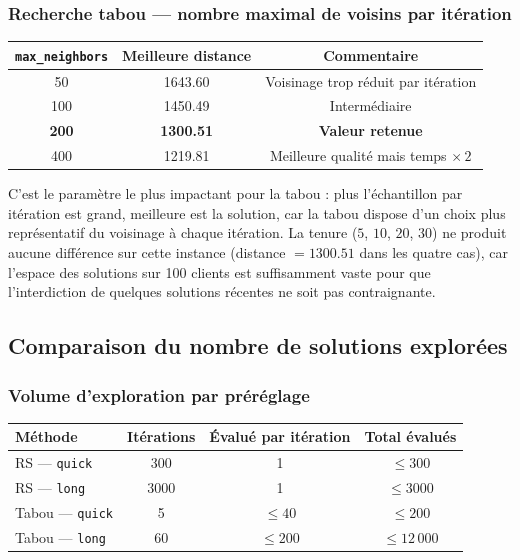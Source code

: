 \documentclass[11pt,a4paper]{article}
\begin{document}
\subsubsection*{Recherche tabou — nombre maximal de voisins par itération}

\begin{center}
\begin{tabular}{ccc}
\toprule
\texttt{max\_neighbors} & Meilleure distance & Commentaire \\
\midrule
50  & 1643.60 & Voisinage trop réduit par itération \\
100 & 1450.49 & Intermédiaire \\
\textbf{200} & \textbf{1300.51} & \textbf{Valeur retenue} \\
400 & 1219.81 & Meilleure qualité mais temps $\times\,2$ \\
\bottomrule
\end{tabular}
\end{center}

C'est le paramètre le plus impactant pour la tabou : plus l'échantillon par itération est grand, meilleure est la solution, car la tabou dispose d'un choix plus représentatif du voisinage à chaque itération. La tenure ($5$, $10$, $20$, $30$) ne produit aucune différence sur cette instance (distance $= 1300.51$ dans les quatre cas), car l'espace des solutions sur 100 clients est suffisamment vaste pour que l'interdiction de quelques solutions récentes ne soit pas contraignante.

\subsection{Comparaison du nombre de solutions explorées}

\subsubsection*{Volume d'exploration par préréglage}

\begin{center}
\begin{tabular}{lccc}
\toprule
Méthode & Itérations & Évalué par itération & Total évalués \\
\midrule
RS — \texttt{quick}    & 300  & 1 & $\leq 300$ \\
RS — \texttt{long}     & 3000 & 1 & $\leq 3000$ \\
Tabou — \texttt{quick} & 5    & $\leq 40$ & $\leq 200$ \\
Tabou — \texttt{long}  & 60   & $\leq 200$ & $\leq 12\,000$ \\
\bottomrule
\end{tabular}
\end{center}
\end{document}
